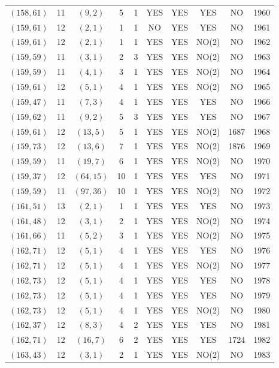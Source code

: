 \begin{longtable}{|c|c|c|c|c|c|c|c|c|c|}
$(158, 61)$ & 11 & $(9, 2)$ & 5 & 1 & YES & YES & YES & NO & 1960\\
$(159, 61)$ & 12 & $(2, 1)$ & 1 & 1 & NO & YES & YES & NO & 1961\\
$(159, 61)$ & 12 & $(2, 1)$ & 1 & 1 & YES & YES & NO(2) & NO & 1962\\
$(159, 59)$ & 11 & $(3, 1)$ & 2 & 3 & YES & YES & NO(2) & NO & 1963\\
$(159, 59)$ & 11 & $(4, 1)$ & 3 & 1 & YES & YES & NO(2) & NO & 1964\\
$(159, 61)$ & 12 & $(5, 1)$ & 4 & 1 & YES & YES & NO(2) & NO & 1965\\
$(159, 47)$ & 11 & $(7, 3)$ & 4 & 1 & YES & YES & YES & NO & 1966\\
$(159, 62)$ & 11 & $(9, 2)$ & 5 & 3 & YES & YES & YES & NO & 1967\\
$(159, 61)$ & 12 & $(13, 5)$ & 5 & 1 & YES & YES & NO(2) & 1687 & 1968\\
$(159, 73)$ & 12 & $(13, 6)$ & 7 & 1 & YES & YES & NO(2) & 1876 & 1969\\
$(159, 59)$ & 11 & $(19, 7)$ & 6 & 1 & YES & YES & NO(2) & NO & 1970\\
$(159, 37)$ & 12 & $(64, 15)$ & 10 & 1 & YES & YES & YES & NO & 1971\\
$(159, 59)$ & 11 & $(97, 36)$ & 10 & 1 & YES & YES & NO(2) & NO & 1972\\
$(161, 51)$ & 13 & $(2, 1)$ & 1 & 1 & YES & YES & YES & NO & 1973\\
$(161, 48)$ & 12 & $(3, 1)$ & 2 & 1 & YES & YES & NO(2) & NO & 1974\\
$(161, 66)$ & 11 & $(5, 2)$ & 3 & 1 & YES & YES & NO(2) & NO & 1975\\
$(162, 71)$ & 12 & $(5, 1)$ & 4 & 1 & YES & YES & YES & NO & 1976\\
$(162, 71)$ & 12 & $(5, 1)$ & 4 & 1 & YES & YES & NO(2) & NO & 1977\\
$(162, 73)$ & 12 & $(5, 1)$ & 4 & 1 & YES & YES & YES & NO & 1978\\
$(162, 73)$ & 12 & $(5, 1)$ & 4 & 1 & YES & YES & YES & NO & 1979\\
$(162, 73)$ & 12 & $(5, 1)$ & 4 & 1 & YES & YES & NO(2) & NO & 1980\\
$(162, 37)$ & 12 & $(8, 3)$ & 4 & 2 & YES & YES & YES & NO & 1981\\
$(162, 71)$ & 12 & $(16, 7)$ & 6 & 2 & YES & YES & YES & 1724 & 1982\\
$(163, 43)$ & 12 & $(3, 1)$ & 2 & 1 & YES & YES & NO(2) & NO & 1983\\

\end{longtable}
